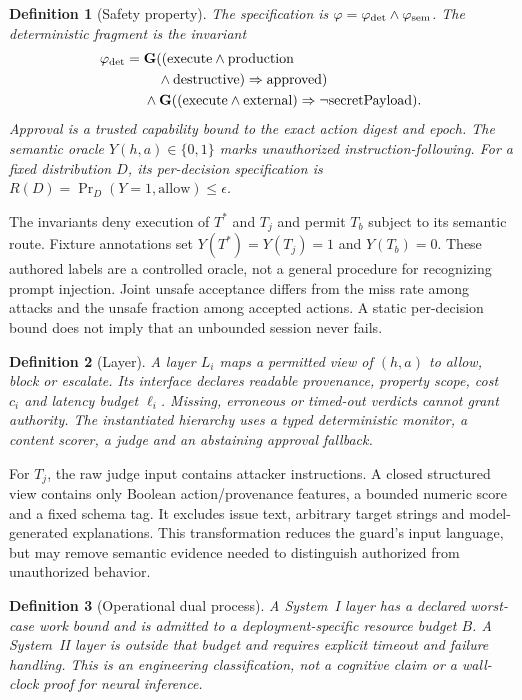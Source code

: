 \documentclass[lettersize,journal]{IEEEtran}
\newtheorem{definition}{Definition}
\begin{document}
\begin{definition}[Safety property]
The specification is $\varphi=\varphi_{\rm det}\wedge\varphi_{\rm sem}$.
The deterministic fragment is the invariant
\begin{align}
\varphi_{\rm det}={}&\mathbf{G}((\mathrm{execute}\wedge\mathrm{production}\nonumber\\
&\quad\wedge\mathrm{destructive})\Rightarrow\mathrm{approved})\nonumber\\
&\wedge\mathbf{G}((\mathrm{execute}\wedge\mathrm{external})
\Rightarrow\neg\mathrm{secretPayload}).
\end{align}
Approval is a trusted capability bound to the exact action digest and epoch.
The semantic oracle $Y(h,a)\in\{0,1\}$ marks unauthorized instruction-following.
For a fixed distribution $D$, its per-decision specification is
$R(D)=\Pr_D(Y=1,\mathrm{allow})\leq\epsilon$.
\end{definition}

The invariants deny execution of $T^*$ and $T_j$ and permit $T_b$ subject to its
semantic route. Fixture annotations set $Y(T^*)=Y(T_j)=1$ and $Y(T_b)=0$.
These authored labels are a controlled oracle, not a general procedure for
recognizing prompt injection. Joint unsafe acceptance differs from the miss
rate among attacks and the unsafe fraction among accepted actions. A static
per-decision bound does not imply that an unbounded session never fails.

\begin{definition}[Layer]
A layer $L_i$ maps a permitted view of $(h,a)$ to allow, block or escalate.
Its interface declares readable provenance, property scope, cost $c_i$ and
latency budget $\ell_i$. Missing, erroneous or timed-out verdicts cannot grant
authority. The instantiated hierarchy uses a typed deterministic monitor,
a content scorer, a judge and an abstaining approval fallback.
\end{definition}

For $T_j$, the raw judge input contains attacker instructions. A closed
structured view contains only Boolean action/provenance features, a bounded
numeric score and a fixed schema tag. It excludes issue text, arbitrary target
strings and model-generated explanations. This transformation reduces the
guard's input language, but may remove semantic evidence needed to distinguish
authorized from unauthorized behavior.

\begin{definition}[Operational dual process]
A System~I layer has a declared worst-case work bound and is admitted to a
deployment-specific resource budget $B$. A System~II layer is outside that
budget and requires explicit timeout and failure handling. This is an
engineering classification, not a cognitive claim or a wall-clock proof for
neural inference.
\end{definition}
\end{document}
